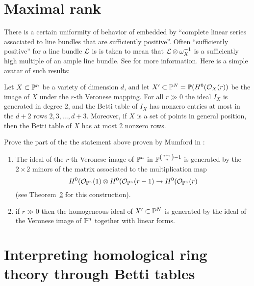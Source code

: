 \section{Maximal rank}

There is a certain uniformity of behavior of  embedded by ``complete linear series associated to line bundles that are sufficiently positive''. Often ``sufficiently positive'' for a line bundle ${\mathcal L}$ is is taken to mean that
${\mathcal L} \otimes \omega_{X}^{-1}$ is a sufficiently high multiple of an ample line bundle. See \cite{Lazarsfeld, Positivity} for more information. Here is a simple avatar of such results:

\begin{fact}
 Let $X\subset {\mathbb P}^{n}$ be a variety of dimension $d$, and let $X'\subset {\mathbb P}^{N} = {\mathbb P}(H^{0}({\mathcal O}_{X}(r))$ be the image of
 $X$ under the $r$-th Veronese mapping. For all $r\gg 0$ the ideal $I_X$ is generated in degree 2,
 and the Betti table of $I_{X}$ has nonzero entries at most in the $d+2$ rows $2,3,\dots,d+3$. Moreover, if 
 $X$ is a set of points in general position, then the Betti table of $X$ has at most 2 nonzero rows.
\end{fact}

\begin{exercise}
Prove the part of the the statement above proven by Mumford in \cite{quadrics}:
\begin{enumerate}

 \item The ideal of the $r$-th Veronese image of ${\mathbb P}^{n}$  in ${\mathbb P}^{{n+r\choose n}-1}$
 is generated by the $2\times 2$ minors 
 of the matrix associated to the multiplication map 
 $$
 H^{0}({\mathcal O}_{{\mathbb P}^{n}}(1) \otimes H^{0}({\mathcal O}_{{\mathbb P}^{n}}(r-1) \to  H^{0}({\mathcal O}_{{\mathbb P}^{n}}(r)
 $$
 (see Theorem~\ref{} %
 for this construction).
 
 \item  if $r\gg 0$ then the homogeneous ideal of $X'\subset {\mathbb P}^{N}$ is generated by the
 ideal of the Veronese image of ${\mathbb P}^{n}$ together with linear forms.
\end{enumerate}
\end{exercise}

\section{Interpreting homological ring theory through Betti tables}

